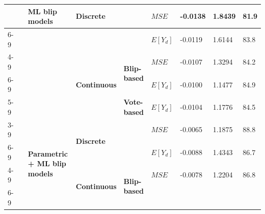\documentclass[a4paper,12pt]{article}
\begin{document}
\begin{table}[]
{\begin{tabular}{|l|l|l|l|l|l|l|l|l|}
                                &                                      & \multirow{5}{*}{\textbf{ML blip models}}                     & \multicolumn{2}{l|}{\multirow{2}{*}{\textbf{Discrete}}}                     & \textbf{$MSE$}  & -0.0138              & 1.8439                        & 81.9              \\ \cline{6-9} 
                                &                                      &                                                              & \multicolumn{2}{l|}{}                                                       & \textbf{$E[Y_d]$} & -0.0119              & 1.6144                        & 83.8              \\ \cline{4-9} 
                                &                                      &                                                              & \multirow{3}{*}{\textbf{Continuous}} & \multirow{2}{*}{\textbf{Blip-based}} & \textbf{$MSE$}  & -0.0107              & 1.3294                        & 84.2              \\ \cline{6-9} 
                                &                                      &                                                              &                                      &                                      & \textbf{$E[Y_d]$} & -0.0100              & 1.1477                        & 84.9              \\ \cline{5-9} 
                                &                                      &                                                              &                                      & \textbf{Vote-based}                  & \textbf{$E[Y_d]$} & -0.0104              & 1.1776                        & 84.5              \\ \cline{3-9} 
                                &                                      & \multirow{5}{*}{\textbf{Parametric + ML blip models}}        & \multicolumn{2}{l|}{\multirow{2}{*}{\textbf{Discrete}}}                     & \textbf{$MSE$}  & -0.0065              & 1.1875                        & 88.8              \\ \cline{6-9} 
                                &                                      &                                                              & \multicolumn{2}{l|}{}                                                       & \textbf{$E[Y_d]$} & -0.0088              & 1.4343                        & 86.7              \\ \cline{4-9} 
                                &                                      &                                                              & \multirow{3}{*}{\textbf{Continuous}} & \multirow{2}{*}{\textbf{Blip-based}} & \textbf{$MSE$}  & -0.0078              & 1.2204                        & 86.8              \\ \cline{6-9} 

\end{tabular}}
\end{table}
\end{document}
